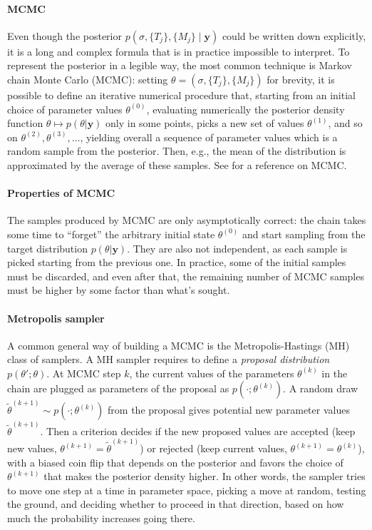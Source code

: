 \documentclass{article}
\begin{document}
    \paragraph{MCMC}

    Even though the posterior $p(\sigma, \{T_j\}, \{M_j\}\mid \mathbf y)$ could be written down explicitly, it is a long and complex formula that is in practice impossible to interpret. To represent the posterior in a legible way, the most common technique is Markov chain Monte Carlo (MCMC): setting $\theta=(\sigma, \{T_j\}, \{M_j\})$ for brevity, it is possible to define an iterative numerical procedure that, starting from an initial choice of parameter values $\theta^{(0)}$, evaluating numerically the posterior density function $\theta\mapsto p(\theta|\mathbf y)$ only in some points, picks a new set of values $\theta^{(1)}$, and so on $\theta^{(2)}, \theta^{(3)}, \ldots$, yielding overall a sequence of parameter values which is a random sample from the posterior. Then, e.g., the mean of the distribution is approximated by the average of these samples. See \citet{brooks2011} for a reference on MCMC.

    \paragraph{Properties of MCMC}

    The samples produced by MCMC are only asymptotically correct: the chain takes some time to ``forget'' the arbitrary initial state $\theta^{(0)}$ and start sampling from the target distribution $p(\theta|\mathbf y)$. They are also not independent, as each sample is picked starting from the previous one. In practice, some of the initial samples must be discarded, and even after that, the remaining number of MCMC samples must be higher by some factor than what's sought.

    \paragraph{Metropolis sampler}

    A common general way of building a MCMC is the Metropolis-Hastings (MH) class of samplers. A MH sampler requires to define a \emph{proposal distribution} $p(\theta';\theta)$. At MCMC step $k$, the current values of the parameters $\theta^{(k)}$ in the chain are plugged as parameters of the proposal as $p(\cdot;\theta^{(k)})$. A random draw $\tilde\theta^{(k+1)}\sim p(\cdot;\theta^{(k)})$ from the proposal gives potential new parameter values $\tilde\theta^{(k+1)}$. Then a criterion decides if the new proposed values are accepted (keep new values, $\theta^{(k+1)} = \tilde\theta^{(k+1)}$) or rejected (keep current values, $\theta^{(k+1)} = \theta^{(k)}$), with a biased coin flip that depends on the posterior and favors the choice of $\theta^{(k+1)}$ that makes the posterior density higher. In other words, the sampler tries to move one step at a time in parameter space, picking a move at random, testing the ground, and deciding whether to proceed in that direction, based on how much the probability increases going there.
\end{document}
